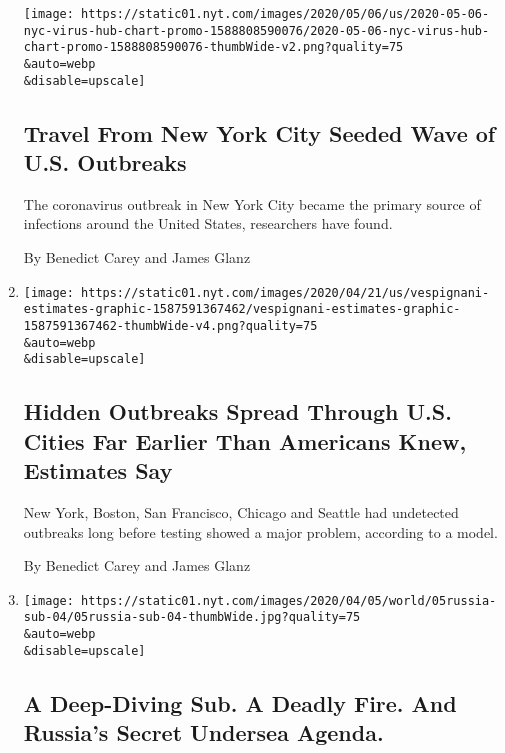 \begin{enumerate}
  \texttt{[image: https://static01.nyt.com/images/2020/05/06/us/2020-05-06-nyc-virus-hub-chart-promo-1588808590076/2020-05-06-nyc-virus-hub-chart-promo-1588808590076-thumbWide-v2.png?quality=75\\\&auto=webp\\\&disable=upscale]}

  \hypertarget{travel-from-new-york-city-seeded-wave-of-us-outbreaks}{%
  \subsection{Travel From New York City Seeded Wave of U.S.
  Outbreaks}\label{travel-from-new-york-city-seeded-wave-of-us-outbreaks}}

  The coronavirus outbreak in New York City became the primary source of
  infections around the United States, researchers have found.

  By Benedict Carey and James Glanz
\item
  \href{/2020/04/23/us/coronavirus-early-outbreaks-cities.html}{}

  \texttt{[image: https://static01.nyt.com/images/2020/04/21/us/vespignani-estimates-graphic-1587591367462/vespignani-estimates-graphic-1587591367462-thumbWide-v4.png?quality=75\\\&auto=webp\\\&disable=upscale]}

  \hypertarget{hidden-outbreaks-spread-through-us-cities-far-earlier-than-americans-knew-estimates-say}{%
  \subsection{Hidden Outbreaks Spread Through U.S. Cities Far Earlier
  Than Americans Knew, Estimates
  Say}\label{hidden-outbreaks-spread-through-us-cities-far-earlier-than-americans-knew-estimates-say}}

  New York, Boston, San Francisco, Chicago and Seattle had undetected
  outbreaks long before testing showed a major problem, according to a
  model.

  By Benedict Carey and James Glanz
\item
  \href{/2020/04/20/world/europe/russian-submarine-fire-losharik.html}{}

  \texttt{[image: https://static01.nyt.com/images/2020/04/05/world/05russia-sub-04/05russia-sub-04-thumbWide.jpg?quality=75\\\&auto=webp\\\&disable=upscale]}

  \hypertarget{a-deep-diving-sub-a-deadly-fire-and-russias-secret-undersea-agenda}{%
  \subsection{A Deep-Diving Sub. A Deadly Fire. And Russia's Secret
  Undersea
  Agenda.}\label{a-deep-diving-sub-a-deadly-fire-and-russias-secret-undersea-agenda}}


\end{enumerate}
